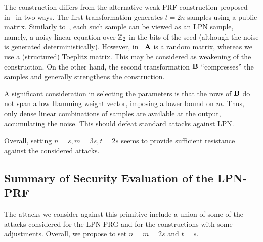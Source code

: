 The construction differs from 
the alternative weak PRF construction proposed
in~\cite{boneh2018-darkmatter} in two ways.
The first transformation generates $t = 2n$ samples using a public matrix.
Similarly to~\cite{boneh2018-darkmatter},
each such sample can be viewed as an LPN sample, namely,
a noisy linear equation over $\mathbb{Z}_2$ in the bits of the seed
(although the noise is generated deterministically).
However, in~\cite{boneh2018-darkmatter} $\mat{A}$ is a random matrix,
whereas we use a (structured) Toeplitz matrix.
This may be considered as weakening of the construction. 
On the other hand, the second transformation $\mat{B}$ ``compresses''
the samples and generally strengthens the construction.

A significant consideration in selecting the parameters is that
the rows of $\mat{B}$ do not span a low Hamming weight vector,
imposing a lower bound on $m$.
Thus, only dense linear combinations of samples are available at the output,
accumulating the noise. This should defeat standard attacks against LPN. 

Overall, setting 
$n=s, m = 3s, t = 2s$ seems to provide sufficient 
resistance against the considered attacks.



\subsection{Summary of Security Evaluation of the LPN-PRF}

The attacks we consider against this primitive include a union of some
of the attacks considered for the LPN-PRG and for the \ttwPRF constructions
with some adjustments. Overall, we propose to set $n=m= 2s$ and $t =s$.
